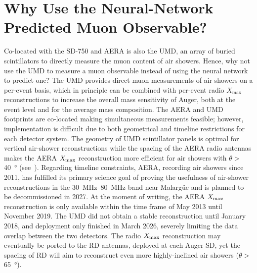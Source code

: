 


\section{Why Use the Neural-Network Predicted Muon Observable?}\label{sec:motivation}

Co-located with the SD-750 and AERA is also the UMD, an array of buried scintillators to directly measure the muon content of air showers.
Hence, why not use the UMD to measure a muon observable instead of using the neural network to predict one?
The UMD provides direct muon measurements of air showers on a per-event basis, which in principle can be combined with per-event radio $X_\text{max}$ reconstructions to increase the overall mass sensitivity of Auger, both at the event level and for the average mass composition.
The AERA and UMD footprints are co-located making simultaneous measurements feasible; however, implementation is difficult due to both geometrical and timeline restrictions for each detector system.
The geometry of UMD scintillator panels is optimal for vertical air-shower reconstructions while the spacing of the AERA radio antennas makes the AERA $X_{\rm max}$ reconstruction more efficient for air showers with $\theta>\,$\qty{40}{\degree} (see~).
Regarding timeline constraints, AERA, recording air showers since 2011, has fulfilled its primary science goal of proving the usefulness of air-shower reconstructions in the \qtyrange{30}{80}{\mega\hertz} band near Malarg\"{u}e and is planned to be decommissioned in 2027.
At the moment of writing, the AERA $X_{\rm max}$ reconstruction is only available within the time frame of May 2013 until November 2019.
The UMD did not obtain a stable reconstruction until January 2018, and deployment only finished in March 2026, severely limiting the data overlap between the two detectors.
The radio $X_{\rm max}$ reconstruction may eventually be ported to the RD antennas, deployed at each Auger SD, yet the spacing of RD will aim to reconstruct even more highly-inclined air showers ($\theta>$\,\qty{65}{\degree}).

